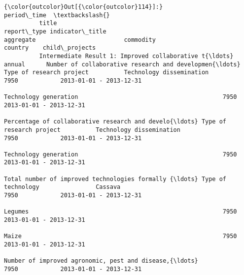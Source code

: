 \documentclass[11pt]{article}
\begin{document}
\begin{Verbatim}[commandchars=\\\{\}]
{\color{outcolor}Out[{\color{outcolor}114}]:}                                                                                                                                                                                                                                               period\_time  \textbackslash{}
          title                                              report\_type indicator\_title                                    aggregate                         commodity                                          country    child\_projects                            
          Intermediate Result 1: Improved collaborative t{\ldots} annual      Number of collaborative research and developmen{\ldots} Type of research project          Technology dissemination                                      7950            2013-01-01 - 2013-12-31   
                                                                                                                                                              Technology generation                                         7950            2013-01-01 - 2013-12-31   
                                                                         Percentage of collaborative research and develo{\ldots} Type of research project          Technology dissemination                                      7950            2013-01-01 - 2013-12-31   
                                                                                                                                                              Technology generation                                         7950            2013-01-01 - 2013-12-31   
                                                                         Total number of improved technologies formally {\ldots} Type of technology                Cassava                                                       7950            2013-01-01 - 2013-12-31   
                                                                                                                                                              Legumes                                                       7950            2013-01-01 - 2013-12-31   
                                                                                                                                                              Maize                                                         7950            2013-01-01 - 2013-12-31   
                                                                                                                                                              Number of improved agronomic, pest and disease,{\ldots}            7950            2013-01-01 - 2013-12-31   

\end{Verbatim}
\end{document}
